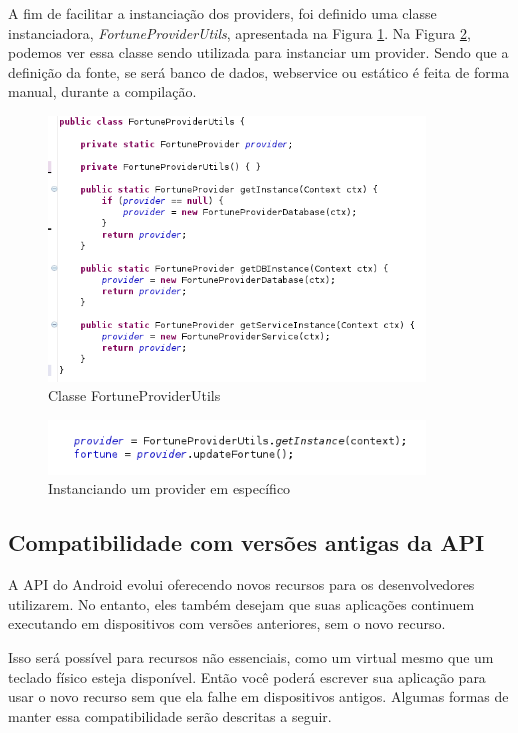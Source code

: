 A fim de facilitar a instanciação dos providers, foi definido uma classe 
instanciadora, {\it FortuneProviderUtils}, apresentada na Figura \ref{provider_utils}.
Na Figura \ref{instanciando_provider}, podemos ver essa classe sendo utilizada para 
instanciar um provider. Sendo que a definição da fonte, se será banco de dados, 
webservice ou estático é feita de forma manual, durante a compilação.

\begin{figure}[h]
    \centering
    \includegraphics[width=10cm]{img/FortuneProviderUtils}
    \caption{Classe FortuneProviderUtils}
    \label{provider_utils}
\end{figure}

\begin{figure}[h]
    \centering
    \includegraphics[width=10cm]{img/instaciando_provider}
    \caption{Instanciando um provider em específico}
    \label{instanciando_provider}
\end{figure}


\subsection{Compatibilidade com versões antigas da API}

A API do Android evolui oferecendo novos recursos para os desenvolvedores utilizarem.
No entanto, eles também desejam que suas aplicações continuem executando em 
dispositivos com versões anteriores, sem o novo recurso.

Isso será possível para recursos não essenciais, como um virtual mesmo que um teclado físico esteja disponível. Então você poderá escrever sua aplicação para usar o novo 
recurso sem que ela falhe em dispositivos antigos. Algumas formas de manter essa 
compatibilidade serão descritas a seguir.

